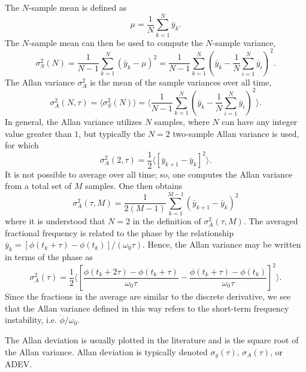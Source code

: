 The $N$-sample mean is defined as
%
\begin{equation}
\mu = \frac{1}{N} \sum_{k=1}^{N} \bar{y}_k.
\end{equation}
%
The $N$-sample mean can then be used to compute the $N$-sample variance,
%
\begin{equation}
\sigma_S^2(N) = \frac{1}{N-1} \sum_{k=1}^{N} \left(\bar{y}_k - \mu\right)^2 = \frac{1}{N-1} \sum_{k=1}^{N} \left(\bar{y}_k - \frac{1}{N} \sum_{i=1}^{N} \bar{y}_i\right)^2.
\end{equation}
%
The Allan variance $\sigma^2_A$ \cite{Allan1974} is the mean of the sample variances over all time,
%
\begin{equation}
\sigma_A^2(N,\tau) = \langle \sigma_S^2(N) \rangle = \bigg\langle \frac{1}{N-1} \sum_{k=1}^{N} \left(\bar{y}_k - \frac{1}{N} \sum_{i=1}^{N} \bar{y}_i\right)^2 \bigg\rangle.
\end{equation}
%
In general, the Allan variance utilizes $N$ samples, where $N$ can have any integer value greater than $1$, but typically the $N=2$ two-sample Allan variance is used, for which
%
\begin{equation} \label{eq:2sallan}
\sigma_A^2(2, \tau) = \frac{1}{2}\langle [\bar{y}_{k+1} - \bar{y}_{k}]^2 \rangle.
\end{equation}
%
It is not possible to average over all time; so, one computes the Allan variance from a total set of $M$ samples. One then obtains
%
\begin{equation}
\sigma_A^2(\tau,M) = \frac{1}{2(M-1)}\sum_{k=1}^{M-1} \left(\bar{y}_{k+1} - \bar{y}_{k}\right)^2
\end{equation}
%
where it is understood that $N=2$ in the definition of $\sigma_A^2(\tau,M)$.
The averaged fractional frequency is related to the phase by the relationship $\bar{y}_k = [\phi(t_k+\tau) - \phi(t_k)]/(\omega_0\tau)$. Hence, the Allan variance may be written in terms of the phase as
% 
\begin{equation} \label{eq:phiallan}
\sigma_A^2(\tau) = \frac{1}{2}\bigg\langle \left[\frac{\phi(t_k+2\tau) - \phi(t_k+\tau)}{\omega_0\tau} - \frac{\phi(t_k+\tau) - \phi(t_k)}{\omega_0\tau}\right]^2 \bigg\rangle.
\end{equation}
Since the fractions in the average are similar to the discrete derivative, we see that the Allan variance defined in this way refers to the short-term frequency instability, i.e. $\dot{\phi}/\omega_0$.

The Allan deviation is usually plotted in the literature and is the square root of the Allan variance. Allan deviation is typically denoted $\sigma_y(\tau)$, $\sigma_A(\tau)$, or ADEV.


